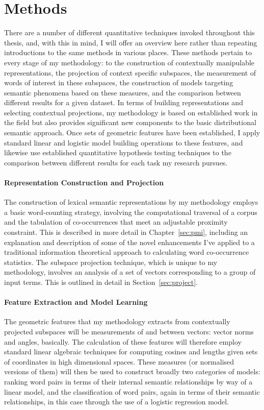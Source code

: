 \section{Methods}
There are a number of different quantitative techniques invoked throughout this thesis, and, with this in mind, I will offer an overview here rather than repeating introductions to the same methods in various places.  These methods pertain to every stage of my methodology: to the construction of contextually manipulable representations, the projection of context specific subspaces, the measurement of words of interest in these subspaces, the construction of models targeting semantic phenomena based on these measures, and the comparison between different results for a given dataset.  In terms of building representations and selecting contextual projections, my methodology is based on established work in the field but also provides significant new components to the basic distributional semantic approach.  Once sets of geometric features have been established, I apply standard linear and logistic model building operations to these features, and likewise use established quantitative hypothesis testing techniques to the comparison between different results for each task my research pursues.

\paragraph{Representation Construction and Projection} The construction of lexical semantic representations by my methodology employs a basic word-counting strategy, involving the computational traversal of a corpus and the tabulation of co-occurrences that meet an adjustable proximity constraint.  This is described in more detail in Chapter~\ref{sec:pmi}, including an explanation and description of some of the novel enhancements I've applied to a traditional information theoretical approach to calculating word co-occurrence statistics.  The subspace projection technique, which is unique to my methodology, involves an analysis of a set of vectors corresponding to a group of input terms.  This is outlined in detail in Section~\ref{sec:project}.

\paragraph{Feature Extraction and Model Learning} The geometric features that my methodology extracts from contextually projected subspaces will be measurements of and between vectors: vector norms and angles, basically.  The calculation of these features will therefore employ standard linear algebraic techniques for computing cosines and lengths given sets of coordinates in high dimensional spaces.  These measures (or normalised versions of them) will then be used to construct broadly two categories of models: ranking word pairs in terms of their internal semantic relationships by way of a linear model, and the classification of word pairs, again in terms of their semantic relationships, in this case through the use of a logistic regression model.

